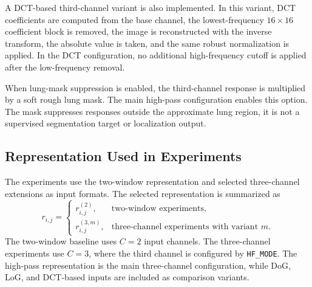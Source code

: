 A DCT-based third-channel variant is also implemented. In this variant, DCT coefficients are computed from the base channel, the lowest-frequency \(16 \times 16\) coefficient block is removed, the image is reconstructed with the inverse transform, the absolute value is taken, and the same robust normalization is applied. In the DCT configuration, no additional high-frequency cutoff is applied after the low-frequency removal.

When lung-mask suppression is enabled, the third-channel response is multiplied by a soft rough lung mask. The main high-pass configuration enables this option. The mask suppresses responses outside the approximate lung region, it is not a supervised segmentation target or localization output.



\subsection{Representation Used in Experiments}
\label{sec:representation_used_experiments}

The experiments use the two-window representation and selected three-channel extensions as input formats. The selected representation is summarized as
\[
r_{i,j}
=
\begin{cases}
r_{i,j}^{(2)}, & \text{two-window experiments},\\
r_{i,j}^{(3,m)}, & \text{three-channel experiments with variant } m.
\end{cases}
\]
The two-window baseline uses \(C=2\) input channels. The three-channel experiments use \(C=3\), where the third channel is configured by \texttt{HF\_MODE}. The high-pass representation is the main three-channel configuration, while DoG, LoG, and DCT-based inputs are included as comparison variants.


